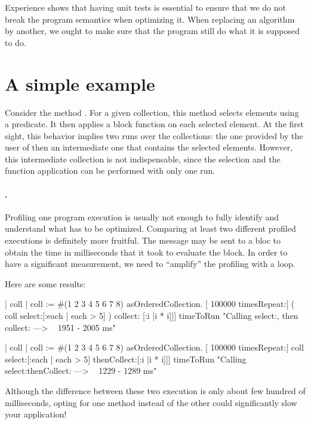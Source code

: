\documentclass[a4paper,10pt,twoside]{book}
\begin{document}
Experience shows that having unit tests is essential to ensure that we do not break the program semantics when optimizing it. When replacing an algorithm by another, we ought to make sure that the program still do what it is supposed to do.


\section{A simple example}

Consider the method . For a given collection, this method selects elements using a predicate. It then applies a block function on each selected element. At the first sight, this behavior implies two runs over the collections: the one provided by the user of  then an intermediate one that contains the selected elements. However, this intermediate collection is not indispensable, since the selection and the function application can be performed with only one run.

\paragraph{.} Profiling one program execution is usually not enough to fully identify and understand what has to be optimized. Comparing at least two different profiled executions is definitely more fruitful. The message  may be sent to a bloc to obtain the time in milliseconds that it took to evaluate the block. In order to have a significant measurement, we need to ``amplify'' the profiling with a loop.

Here are some results:
\begin{code}{}
	| coll |
	coll := #(1 2 3 4 5 6 7 8) asOrderedCollection. 
	[ 100000 timesRepeat:[ ( coll select:[:each | each > 5] ) collect: [:i |i * i]]] timeToRun
	"Calling select:, then collect: ---> ~ 1951 - 2005 ms"

	| coll |
	coll := #(1 2 3 4 5 6 7 8) asOrderedCollection. 
	[ 100000 timesRepeat:[ coll select:[:each | each > 5] thenCollect:[:i |i * i]]] timeToRun
	"Calling select:thenCollect: ---> ~ 1229 - 1289 ms"
\end{code}

Although the difference between these two execution is only about few hundred of milliseconds, opting for one method instead of the other could significantly slow your application!
\end{document}

